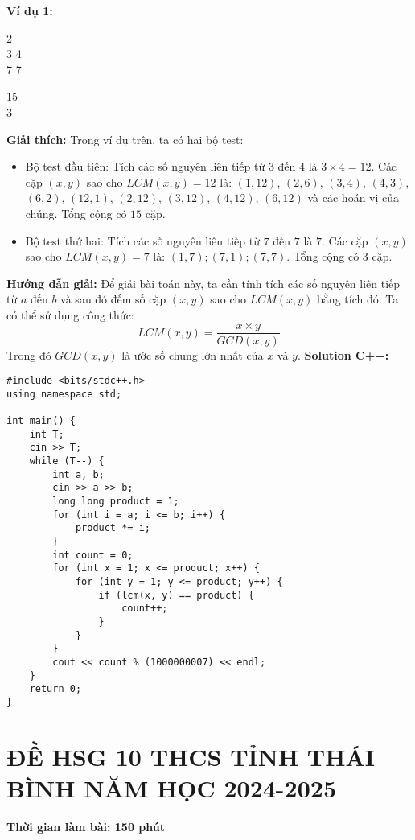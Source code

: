 \documentclass[12pt]{scrartcl}  %
\begin{document}
\textbf{Ví dụ 1:}
\begin{tcolorbox}[colback=gray!5!white, colframe=blue!50!black, title=Input]
2\\
3 4\\
7 7\\
\end{tcolorbox}
\begin{tcolorbox}[colback=gray!5!white, colframe=green!50!black, title=Output]
15\\
3
\end{tcolorbox}
\textbf{Giải thích:}
Trong ví dụ trên, ta có hai bộ test:
\begin{itemize}
    \item Bộ test đầu tiên: Tích các số nguyên liên tiếp từ $3$ đến $4$ là $3 \times 4 = 12$. Các cặp $(x, y)$ sao cho $LCM(x, y) = 12$ là: $(1, 12)$, $(2, 6)$, $(3, 4)$, $(4, 3)$, $(6, 2)$, $(12, 1)$, $(2, 12)$, $(3, 12)$, $(4, 12)$, $(6, 12)$ và các hoán vị của chúng. Tổng cộng có $15$ cặp.
    \item Bộ test thứ hai: Tích các số nguyên liên tiếp từ $7$ đến $7$ là $7$. Các cặp $(x, y)$ sao cho $LCM(x, y) = 7$ là: $(1, 7); (7, 1); (7, 7)$. Tổng cộng có $3$ cặp.
\end{itemize}
\textbf{Hướng dẫn giải:}
Để giải bài toán này, ta cần tính tích các số nguyên liên tiếp từ $a$ đến $b$ và sau đó đếm số cặp $(x, y)$ sao cho $LCM(x, y)$ bằng tích đó. Ta có thể sử dụng công thức:
\[LCM(x, y) = \frac{x \times y}{GCD(x, y)}\]
Trong đó $GCD(x, y)$ là ước số chung lớn nhất của $x$ và $y$.
\textbf{Solution C++:}
\begin{lstlisting}
#include <bits/stdc++.h>
using namespace std;

int main() {
    int T;
    cin >> T;
    while (T--) {
        int a, b;
        cin >> a >> b;
        long long product = 1;
        for (int i = a; i <= b; i++) {
            product *= i;
        }
        int count = 0;
        for (int x = 1; x <= product; x++) {
            for (int y = 1; y <= product; y++) {
                if (lcm(x, y) == product) {
                    count++;
                }
            }
        }
        cout << count % (1000000007) << endl;
    }
    return 0;
}
\end{lstlisting}

\section{ĐỀ HSG 10 THCS TỈNH THÁI BÌNH NĂM HỌC 2024-2025}

\textbf{Thời gian làm bài: 150 phút}
\end{document}
